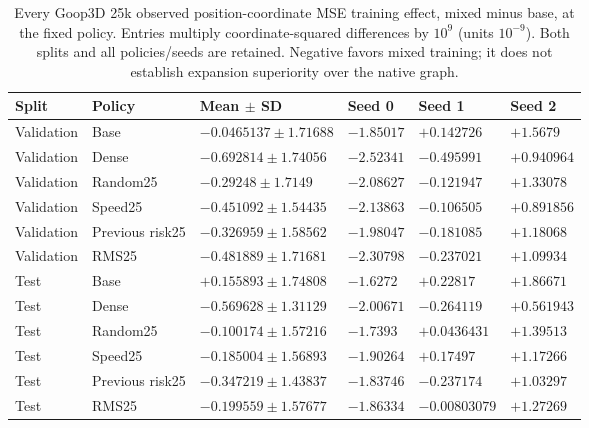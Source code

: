 \begin{table}[p]
\centering\scriptsize
\caption{Every Goop3D 25k observed position-coordinate MSE training effect, mixed minus base, at the fixed policy. Entries multiply coordinate-squared differences by $10^9$ (units $10^{-9}$). Both splits and all policies/seeds are retained. Negative favors mixed training; it does not establish expansion superiority over the native graph.}
\label{tab:goop3d25k-observed-position-training}
\setlength{\tabcolsep}{3pt}
\begin{tabular}{llllll}
\toprule
Split & Policy & Mean $\pm$ SD & Seed 0 & Seed 1 & Seed 2\\
\midrule
Validation & Base & $-0.0465137\pm1.71688$ & $-1.85017$ & $+0.142726$ & $+1.5679$\\
Validation & Dense & $-0.692814\pm1.74056$ & $-2.52341$ & $-0.495991$ & $+0.940964$\\
Validation & Random25 & $-0.29248\pm1.7149$ & $-2.08627$ & $-0.121947$ & $+1.33078$\\
Validation & Speed25 & $-0.451092\pm1.54435$ & $-2.13863$ & $-0.106505$ & $+0.891856$\\
Validation & Previous risk25 & $-0.326959\pm1.58562$ & $-1.98047$ & $-0.181085$ & $+1.18068$\\
Validation & RMS25 & $-0.481889\pm1.71681$ & $-2.30798$ & $-0.237021$ & $+1.09934$\\
Test & Base & $+0.155893\pm1.74808$ & $-1.6272$ & $+0.22817$ & $+1.86671$\\
Test & Dense & $-0.569628\pm1.31129$ & $-2.00671$ & $-0.264119$ & $+0.561943$\\
Test & Random25 & $-0.100174\pm1.57216$ & $-1.7393$ & $+0.0436431$ & $+1.39513$\\
Test & Speed25 & $-0.185004\pm1.56893$ & $-1.90264$ & $+0.17497$ & $+1.17266$\\
Test & Previous risk25 & $-0.347219\pm1.43837$ & $-1.83746$ & $-0.237174$ & $+1.03297$\\
Test & RMS25 & $-0.199559\pm1.57677$ & $-1.86334$ & $-0.00803079$ & $+1.27269$\\
\bottomrule
\end{tabular}
\end{table}

